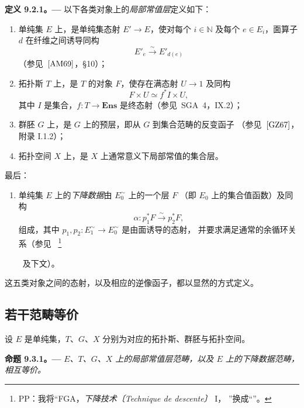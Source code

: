 \par\medskip\noindent{}\textbf{定义 9.2.1。---}\enspace
以下各类对象上的\emph{局部常值层}定义如下：
\begin{enumerate}
\renewcommand{\labelenumi}{(\arabic{enumi})}
\item 单纯集 \(E\) 上，是单纯集态射 \(E'\to E\)，使对每个 \(i\in\mathbb{N}\)
  及每个 \(e\in E_i\)，面算子 \(d\) 在纤维之间诱导同构
  \[
    E'_e\xrightarrow{\sim}E'_{d(e)}
  \]
  （参见\ \([{\rm AM69}]\)，\S10）；
\item 拓扑斯 \(T\) 上，是 \(T\) 的对象 \(F\)，使存在满态射 \(U\to 1\) 及同构
  \[
    F\times U\simeq f^*I\times U,
  \]
  其中 \(I\) 是集合，\(f:T\to\mathbf{Ens}\) 是终态射（参见\ SGA~4，IX.2）；
\item 群胚 \(G\) 上，是 \(G\) 上的预层，即从 \(G\) 到集合范畴的反变函子
  （参见\ \([{\rm GZ67}]\)，附录 I.1.2）；
\item 拓扑空间 \(X\) 上，是 \(X\) 上通常意义下局部常值的集合层。
\end{enumerate}
最后：
\begin{enumerate}
\renewcommand{\labelenumi}{(\arabic{enumi})}
\setcounter{enumi}{4}
\item 单纯集 \(E\) 上的\emph{下降数据}由 \(E_0^{\sim}\) 上的一个层 \(F\)
  （即 \(E_0\) 上的集合值函数）及同构
  \[
    \alpha:p_1^*F\xrightarrow{\sim}p_2^*F,
  \]
  组成，其中 \(p_1,p_2:E_1^{\sim}\to E_0^{\sim}\) 是由面诱导的态射，
  并要求满足通常的余循环关系（参见\ %
  \begingroup
  \renewcommand{\thefootnote}{1}
  \footnote{PP：我将“FGA，\emph{下降技术〔Technique de descente〕} I，
  ”换成“”。}
  \endgroup
  \addtocounter{footnote}{-1}%
  \ 及下文）。
\end{enumerate}

这五类对象之间的态射，以及相应的逆像函子，都以显然的方式定义。

\subsection{若干范畴等价}

设 \(E\) 是单纯集，\(T\)、\(G\)、\(X\) 分别为对应的拓扑斯、群胚与拓扑空间。

\par\medskip\noindent{}\textbf{命题 9.3.1。---}\enspace
\emph{\(E\)、\(T\)、\(G\)、\(X\) 上的局部常值层范畴，以及 \(E\) 上的下降数据范畴，相互等价。}

